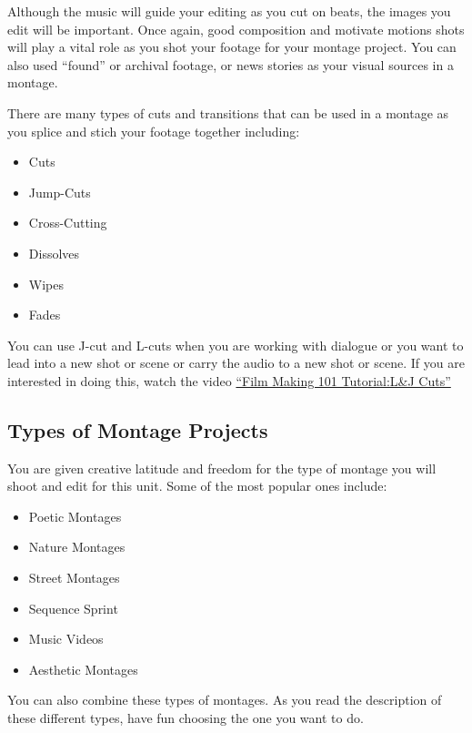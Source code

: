 \documentclass[
]{book}
\providecommand{\tightlist}{%
  \setlength{\itemsep}{0pt}\setlength{\parskip}{0pt}}
\begin{document}
Although the music will guide your editing as you cut on beats, the images you edit will be important. Once again, good composition and motivate motions shots will play a vital role as you shot your footage for your montage project. You can also used ``found'' or archival footage, or news stories as your visual sources in a montage.

There are many types of cuts and transitions that can be used in a montage as you splice and stich your footage together including:

\begin{itemize}
\tightlist
\item
  Cuts
\item
  Jump-Cuts
\item
  Cross-Cutting
\item
  Dissolves
\item
  Wipes
\item
  Fades
\end{itemize}

You can use J-cut and L-cuts when you are working with dialogue or you want to lead into a new shot or scene or carry the audio to a new shot or scene. If you are interested in doing this, watch the video \href{https://www.youtube.com/watch?v=PAvJevWUVsc}{``Film Making 101 Tutorial:L\&J Cuts''}

\hypertarget{types-of-montage-projects}{%
\subsection*{Types of Montage Projects}\label{types-of-montage-projects}}

You are given creative latitude and freedom for the type of montage you will shoot and edit for this unit. Some of the most popular ones include:

\begin{itemize}
\tightlist
\item
  Poetic Montages
\item
  Nature Montages
\item
  Street Montages
\item
  Sequence Sprint
\item
  Music Videos
\item
  Aesthetic Montages
\end{itemize}

You can also combine these types of montages. As you read the description of these different types, have fun choosing the one you want to do.
\end{document}
